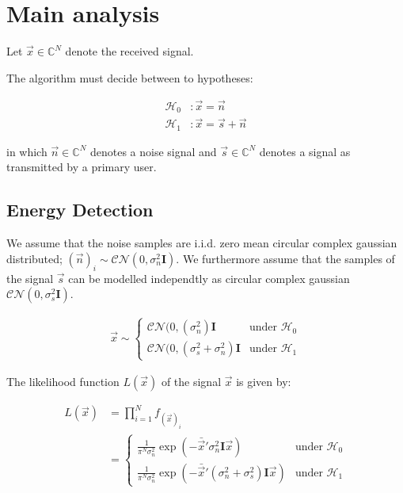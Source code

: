 \documentclass[a4paper, openany, oneside]{memoir}
\begin{document}
\section{Main analysis}

Let $\vec{x} \in \mathbb{C}^{N}$ denote the received signal. 

The algorithm must decide between to hypotheses:

\begin{align}\label{eq:hypotheses}
  \mathcal{H}_0&: \vec{x} = \vec{n}\\
  \mathcal{H}_1&: \vec{x} = \vec{s} + \vec{n}
\end{align}

in which $\vec{n} \in \mathbb{C}^{N} $ denotes a noise signal and $\vec{s} \in \mathbb{C}^{N}$ denotes a signal as transmitted by a primary user.

\subsection{Energy Detection}
We assume that the noise samples are i.i.d. zero mean circular complex gaussian distributed; $(\vec{n})_i \sim \mathcal{CN}(0, \sigma_n^2 \mathbf{I})$. 
We furthermore assume that the samples of the signal $\vec{s}$ can be modelled independtly as circular complex gaussian $\mathcal{CN}(0, \sigma_s^2 \mathbf{I})$. %

\begin{align*}
\vec{x} \sim 
    \begin{cases}
        \mathcal{CN}(0, (\sigma_n^2)\mathbf{I} & \text{under $\mathcal{H}_0$} \\
        \mathcal{CN}(0, (\sigma_s^2 + \sigma_n^2)\mathbf{I} & \text{under $\mathcal{H}_1$}
    \end{cases}
\end{align*} 

The likelihood function $L(\vec{x})$ of the signal $\vec{x}$ is given by:

\begin{align*}
    L(\vec{x}) &= \prod_{i=1}^N f_{(\vec{x})_i}\\
    &= \begin{cases}
        \frac{1}{\pi^N \sigma_n^2} \exp(-\bar{\vec{x}}'\sigma_n^2\mathbf{I}\vec{x}) & \text{under $\mathcal{H}_0$} \\
        \frac{1}{\pi^N \sigma_n^2} \exp(-\bar{\vec{x}}'(\sigma_n^2+\sigma_s^2)\mathbf{I}\vec{x}) & \text{under $\mathcal{H}_1$}
    \end{cases}
\end{align*}
\end{document}

